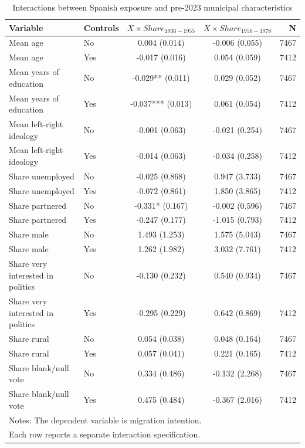 \begin{table}[!htbp]
\centering
\caption{Interactions between Spanish exposure and pre-2023 municipal characteristics}
\label{tab:share_interactions_key}
\small
\begin{tabular}{llccr}
\hline
Variable & Controls & $X \times Share_{1936-1955}$ & $X \times Share_{1956-1978}$ & N \\
\hline
Mean age & No & 0.004 (0.014) & -0.006 (0.055) & 7467 \\
Mean age & Yes & -0.017 (0.016) & 0.054 (0.059) & 7412 \\
Mean years of education & No & -0.029** (0.011) & 0.029 (0.052) & 7467 \\
Mean years of education & Yes & -0.037*** (0.013) & 0.061 (0.054) & 7412 \\
Mean left-right ideology & No & -0.001 (0.063) & -0.021 (0.254) & 7467 \\
Mean left-right ideology & Yes & -0.014 (0.063) & -0.034 (0.258) & 7412 \\
Share unemployed & No & -0.025 (0.868) & 0.947 (3.733) & 7467 \\
Share unemployed & Yes & -0.072 (0.861) & 1.850 (3.865) & 7412 \\
Share partnered & No & -0.331* (0.167) & -0.002 (0.596) & 7467 \\
Share partnered & Yes & -0.247 (0.177) & -1.015 (0.793) & 7412 \\
Share male & No & 1.493 (1.253) & 1.575 (5.043) & 7467 \\
Share male & Yes & 1.262 (1.982) & 3.032 (7.761) & 7412 \\
Share very interested in politics & No & -0.130 (0.232) & 0.540 (0.934) & 7467 \\
Share very interested in politics & Yes & -0.295 (0.229) & 0.642 (0.869) & 7412 \\
Share rural & No & 0.054 (0.038) & 0.048 (0.164) & 7467 \\
Share rural & Yes & 0.057 (0.041) & 0.221 (0.165) & 7412 \\
Share blank/null vote & No & 0.334 (0.486) & -0.132 (2.268) & 7467 \\
Share blank/null vote & Yes & 0.475 (0.484) & -0.367 (2.016) & 7412 \\
\hline
\multicolumn{5}{l}{\footnotesize Notes: The dependent variable is migration intention.} \\
\multicolumn{5}{l}{\footnotesize Each row reports a separate interaction specification.} \\

\end{tabular}
\end{table}
